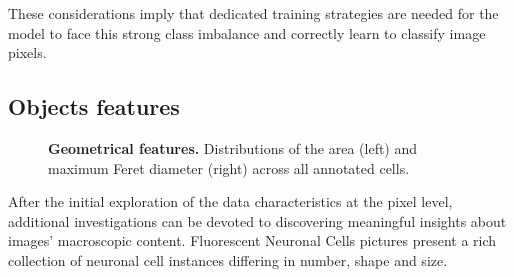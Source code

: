 These considerations imply that dedicated training strategies are needed for the model to face this strong class imbalance and correctly learn to classify image pixels.

\subsection{Objects features}
\begin{figure}
    \centering
    \caption{\textbf{Geometrical features.} Distributions of the area (left) and maximum Feret diameter (right) across all annotated cells.}
    \label{fig:dataset:geom}
\end{figure}
After the initial exploration of the data characteristics at the pixel level, additional investigations can be devoted to discovering meaningful insights about images' macroscopic content.
Fluorescent Neuronal Cells pictures present a rich collection of neuronal cell instances differing in number, shape and size.

